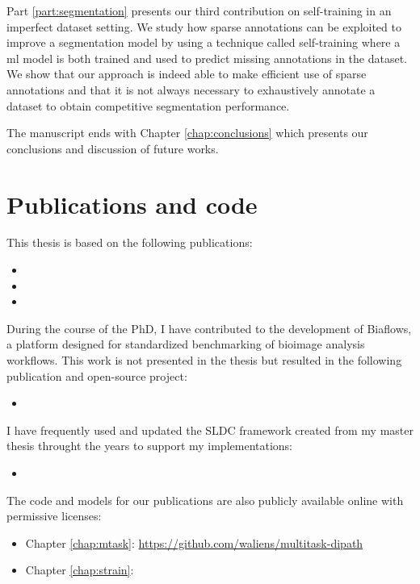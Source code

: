 Part \ref{part:segmentation} presents our third contribution on self-training in an imperfect dataset setting. We study how sparse annotations can be exploited to improve a segmentation model by using a technique called self-training where a \acrlong{ml} model is both trained and used to predict missing annotations in the dataset. We show that our approach is indeed able to make efficient use of sparse annotations and that it is not always necessary to exhaustively annotate a dataset to obtain competitive segmentation performance. 

The manuscript ends with Chapter \ref{chap:conclusions} which presents our conclusions and discussion of future works.

\section{Publications and code}

This thesis is based on the following publications:
\begin{itemize}
  \item {}
  \item {}
  \item {}
\end{itemize}

During the course of the PhD, I have contributed to the development of Biaflows, a platform designed for standardized benchmarking of bioimage analysis workflows. This work is not presented in the thesis but resulted in the following publication and open-source project: 
\begin{itemize}
  \item {}
\end{itemize}

I have frequently used and updated the SLDC framework created from my master thesis throught the years to support my implementations:
\begin{itemize}
  \item {}
\end{itemize}

The code and models for our publications are also publicly available online with permissive licenses:
\begin{itemize}
  \item Chapter \ref{chap:mtask}: \url{https://github.com/waliens/multitask-dipath}
  \item Chapter \ref{chap:strain}: 
\end{itemize}

